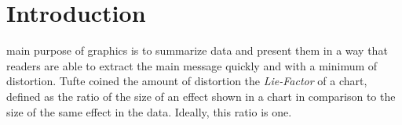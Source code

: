 \section{Introduction}
%
%



% 
% 
% 
% 
   main purpose of graphics is to summarize data and present them in a way that readers are able to extract the main message quickly and with a minimum of distortion. Tufte  coined the amount of distortion the \emph{Lie-Factor} \citep[p. 57--69]{tufte} of a chart, defined as the ratio of the size of an effect shown in a chart in comparison to the size of the same effect in the data. Ideally, this ratio is one. 

